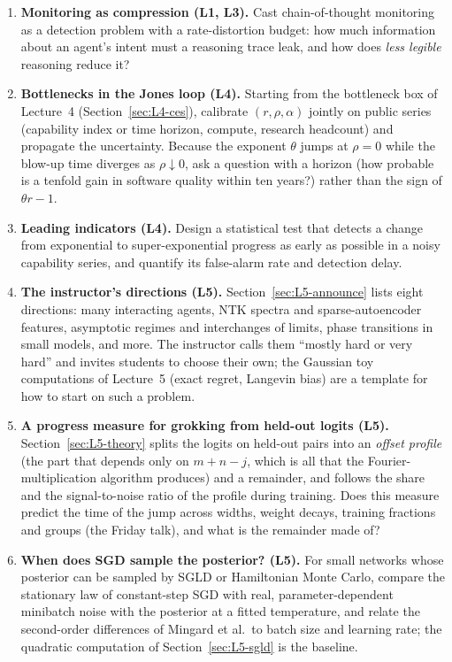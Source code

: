 \begin{enumerate}
  \item \textbf{Monitoring as compression (L1, L3).} Cast chain-of-thought monitoring as a detection problem with a rate-distortion budget: how much information about an agent's intent must a reasoning trace leak, and how does \emph{less legible} reasoning reduce it?
  \item \textbf{Bottlenecks in the Jones loop (L4).} Starting from the bottleneck box of Lecture~4 (Section~\ref{sec:L4-ces}), calibrate $(r,\rho,\alpha)$ jointly on public series (capability index or time horizon, compute, research headcount) and propagate the uncertainty. Because the exponent $\theta$ jumps at $\rho=0$ while the blow-up time diverges as $\rho\downarrow0$, ask a question with a horizon (how probable is a tenfold gain in software quality within ten years?) rather than the sign of $\theta r-1$.
  \item \textbf{Leading indicators (L4).} Design a statistical test that detects a change from exponential to super-exponential progress as early as possible in a noisy capability series, and quantify its false-alarm rate and detection delay.
  \item \textbf{The instructor's directions (L5).} Section~\ref{sec:L5-announce} lists eight directions: many interacting agents, NTK spectra and sparse-autoencoder features, asymptotic regimes and interchanges of limits, phase transitions in small models, and more. The instructor calls them ``mostly hard or very hard'' and invites students to choose their own; the Gaussian toy computations of Lecture~5 (exact regret, Langevin bias) are a template for how to start on such a problem.
  \item \textbf{A progress measure for grokking from held-out logits (L5).} Section~\ref{sec:L5-theory} splits the logits on held-out pairs into an \emph{offset profile} (the part that depends only on $m+n-j$, which is all that the Fourier-multiplication algorithm produces) and a remainder, and follows the share and the signal-to-noise ratio of the profile during training. Does this measure predict the time of the jump across widths, weight decays, training fractions and groups (the Friday talk), and what is the remainder made of?
  \item \textbf{When does SGD sample the posterior? (L5).} For small networks whose posterior can be sampled by SGLD or Hamiltonian Monte Carlo, compare the stationary law of constant-step SGD with real, parameter-dependent minibatch noise with the posterior at a fitted temperature, and relate the second-order differences of Mingard et al.\ to batch size and learning rate; the quadratic computation of Section~\ref{sec:L5-sgld} is the baseline.


\end{enumerate}
